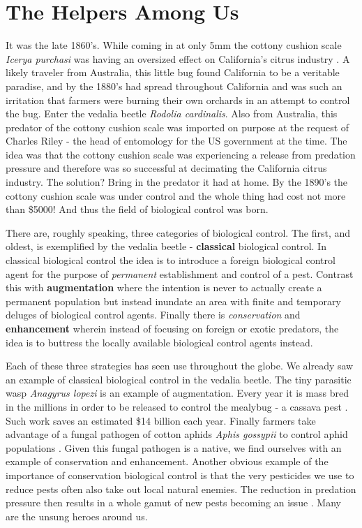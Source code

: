 \documentclass[11pt,a5paper]{book}
\begin{document}
\section{The Helpers Among Us}
It was the late 1860's. While coming in at only 5mm the cottony cushion scale \textit{Icerya purchasi} was having an oversized effect on California's citrus industry \cite{ahajek}. A likely traveler from Australia, this little bug found California to be a veritable paradise, and by the 1880's had spread throughout California and was such an irritation that farmers were burning their own orchards in an attempt to control the bug. Enter the vedalia beetle \textit{Rodolia cardinalis}. Also from Australia, this predator of the cottony cushion scale was imported on purpose at the request of Charles Riley - the head of entomology for the US government at the time. The idea was that the cottony cushion scale was experiencing a release from predation pressure and therefore was so successful at decimating the California citrus industry. The solution? Bring in the predator it had at home. By the 1890's the cottony cushion scale was under control and the whole thing had cost not more than \$5000! And thus the field of biological control was born.
\newline

There are, roughly speaking, three categories of biological control. The first, and oldest, is exemplified by the vedalia beetle - \textbf{classical} biological control. In classical biological control the idea is to introduce a foreign biological control agent for the purpose of \textit{permanent} establishment and control \cite{ahajek} of a pest. Contrast this with \textbf{augmentation} where the intention is never to actually create a permanent population but instead inundate an area with finite and temporary deluges of biological control agents. Finally there is \textit{conservation} and \textbf{enhancement} wherein instead of focusing on foreign or exotic predators, the idea is to buttress the locally available biological control agents instead. 
\newline

Each of these three strategies has seen use throughout the globe. We already saw an example of classical biological control in the vedalia beetle. The tiny parasitic wasp \textit{Anagyrus lopezi} is an example of augmentation. Every year it is mass bred in the millions in order to be released to control the mealybug - a cassava pest \cite{wpark}. Such work saves an estimated \$14 billion each year. Finally farmers take advantage of a fungal pathogen of cotton aphids \textit{Aphis gossypii} to control aphid populations \cite{ahajek}. Given this fungal pathogen is a native, we find ourselves with an example of conservation and enhancement. Another obvious example of the importance of conservation biological control is that the very pesticides we use to reduce pests often also take out local natural enemies. The reduction in predation pressure then results in a whole gamut of new pests becoming an issue \cite{ridgway}. Many are the unsung heroes around us.
\end{document}
